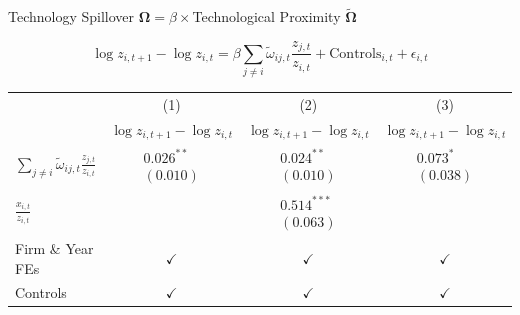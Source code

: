 \documentclass[
  10pt,
  aspectratio=169,   %
]{beamer}
\theoremstyle{plain}
\begin{document}
\begin{frame}{Technology Spillover $\bm{\Omega}=\beta\times$Technological Proximity $\bm{\widetilde{\Omega}}$ \hyperlink{first_stage}{}}
  \label{regression}
  {\footnotesize
    \[
      \log z_{i,t+1}-\log z_{i,t}
      =\beta\sum_{j\neq i}\tilde{\omega}_{ij,t} \frac{z_{j,t}}{z_{i,t}}
      +\text{Controls}_{i,t}
      +\epsilon_{i,t}
    \] \pause
    \begin{center}
      \setlength{\tabcolsep}{6pt} %
      \begin{tabular}{lccc}
        \hline\hline
                         & (1)                                                             & (2)          & (3)          \\
                         & $\log z_{i,t+1}-\log z_{i,t}$
                         & $\log z_{i,t+1}-\log z_{i,t}$
                         & $\log z_{i,t+1}-\log z_{i,t}$                                                                 \\
        \hline
        $\sum_{j\neq i}\tilde{\omega}_{ij,t} \frac{z_{j,t}}{z_{i,t}}$
                         & $\begin{array}{c}\text{0.026}^{**}\\(\text{0.010})\end{array}$
                         & $\begin{array}{c}\text{0.024}^{**}\\(\text{0.010})\end{array}$
                         & $\begin{array}{c}\text{0.073}^{*}\\(\text{0.038})\end{array}$                                 \\
        $\frac{x_{i,t}}{z_{i,t}}$
                         &
                         & $\begin{array}{c}\text{0.514}^{***}\\(\text{0.063})\end{array}$
                         &                                                                                               \\
        \hline
        Firm \& Year FEs & $\checkmark$                                                    & $\checkmark$ & $\checkmark$ \\
        Controls         & $\checkmark$                                                    & $\checkmark$ & $\checkmark$ \\

\end{tabular}
\end{center}}
\end{frame}
\end{document}
